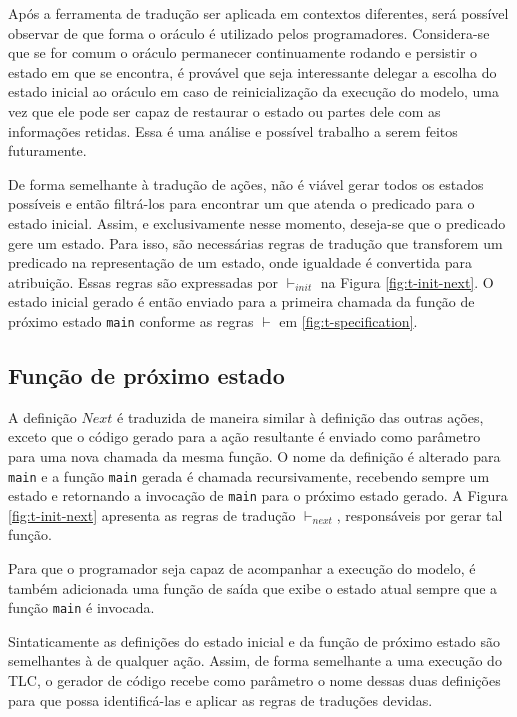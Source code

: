 Após a ferramenta de tradução ser aplicada em contextos diferentes, será
possível observar de que forma o oráculo é utilizado pelos programadores.
Considera-se que se for comum o oráculo permanecer continuamente rodando e
persistir o estado em que se encontra, é provável que seja interessante delegar a
escolha do estado inicial ao oráculo em caso de reinicialização da execução do
modelo, uma vez que ele pode ser capaz de restaurar o estado ou partes dele com
as informações retidas. Essa é uma análise e possível trabalho a serem feitos
futuramente.

De forma semelhante à tradução de ações, não é viável gerar todos os estados
possíveis e então filtrá-los para encontrar um que atenda o predicado para o
estado inicial. Assim, e exclusivamente nesse momento, deseja-se que o predicado
gere um estado. Para isso, são necessárias regras de tradução que transforem um
predicado na representação de um estado, onde igualdade é convertida para
atribuição. Essas regras são expressadas por $\vdash_{init}$ na Figura
\ref{fig:t-init-next}. O estado inicial gerado é então enviado para a primeira
chamada da função de próximo estado \texttt{main} conforme as regras $\vdash$ em \ref{fig:t-specification}.

\subsection{Função de próximo estado}

A definição $Next$ é traduzida de maneira similar à definição das outras ações,
exceto que o código gerado para a ação resultante é enviado como parâmetro para
uma nova chamada da mesma função. O nome da definição é alterado para
\texttt{main} e a função \texttt{main} gerada é chamada recursivamente,
recebendo sempre um estado e retornando a invocação de \texttt{main} para o
próximo estado gerado. A Figura \ref{fig:t-init-next} apresenta as regras de
tradução $\vdash_{next}$, responsáveis por gerar tal função.

Para que o programador seja capaz de acompanhar a execução do modelo, é também
adicionada uma função de saída que exibe o estado atual sempre que a função
\texttt{main} é invocada.



Sintaticamente as definições do estado inicial e da função de próximo estado são
semelhantes à de qualquer ação. Assim, de forma semelhante a uma execução do
TLC, o gerador de código recebe como parâmetro o nome dessas duas definições
para que possa identificá-las e aplicar as regras de traduções devidas.

